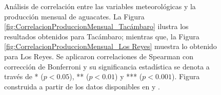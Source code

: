 \begin{figure}[ht]
\centering
{}
\hfill
{}
\caption{Análisis de correlación entre las variables meteorológicas y la producción mensual de aguacates. La Figura \ref{fig:CorrelacionProduccionMensual_Tacámbaro} ilustra los resultados obtenidos para Tacámbaro; mientras que, la Figura \ref{fig:CorrelacionProduccionMensual_Los Reyes} muestra lo obtenido para Los Reyes. Se aplicaron correlaciones de Spearman con corrección de Bonferroni y su significancia estadística se denota a través de * ($p<0.05$), ** ($p<0.01$) y *** ($p<0.001$). Figura construida a partir de los datos disponibles en \cite{AvanceSiembrasCosechas} y \cite{Rodriguez-Moreno_2021}.}
\label{fig:CorrelacionProduccionMensual}
\end{figure}


